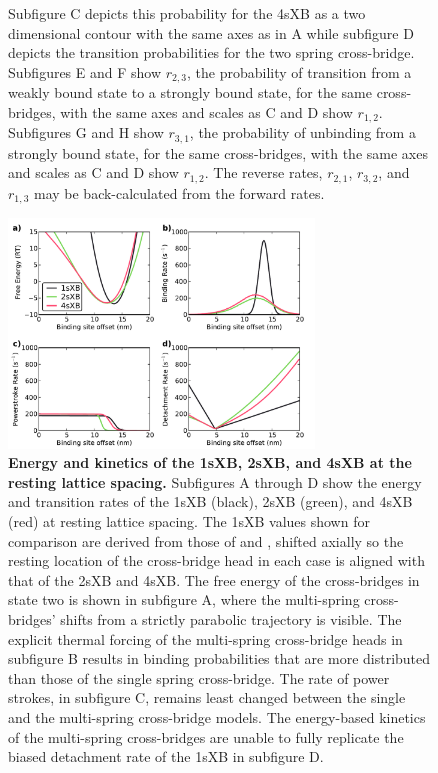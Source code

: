 \documentclass[]{article}
\begin{document}
\begin{figure}[ht]
\begin{center}
{        Subfigure C depicts this probability for the 4sXB as a two dimensional contour with the same axes as in A while subfigure D depicts the transition probabilities for the two spring cross-bridge.
        Subfigures E and F show $r_{2,3}$, the probability of transition from a weakly bound state to a strongly bound state, for the same cross-bridges, with the same axes and scales as C and D show $r_{1,2}$.
        Subfigures G and H show $r_{3,1}$, the probability of unbinding from a strongly bound state, for the same cross-bridges, with the same axes and scales as C and D show $r_{1,2}$.
        The reverse rates, $r_{2,1}$, $r_{3,2}$, and $r_{1,3}$ may be back-calculated from the forward rates.
    }
    \end{center}
\end{figure}

\begin{figure}[ht]
    \begin{center}
    \includegraphics[width=3.2in]{../imgs/Figure3.pdf}
    \caption{
        \label{fig_kinetics_cuts}
        \textbf{Energy and kinetics of the 1sXB, 2sXB, and 4sXB at the resting lattice spacing.}
        Subfigures A through D show the energy and transition rates of the 1sXB (black), 2sXB (green), and 4sXB (red) at resting lattice spacing.
        The 1sXB values shown for comparison are derived from those of \citet{Daniel1998} and \citet{Tanner2007}, shifted axially so the resting location of the cross-bridge head in each case is aligned with that of the 2sXB and 4sXB\@. 
        The free energy of the cross-bridges in state two is shown in subfigure A, where the multi-spring cross-bridges' shifts from a strictly parabolic trajectory is visible.
        The explicit thermal forcing of the multi-spring cross-bridge heads in subfigure B results in binding probabilities that are more distributed than those of the single spring cross-bridge.
        The rate of power strokes, in subfigure C, remains least changed between the single and the multi-spring cross-bridge models.
        The energy-based kinetics of the multi-spring cross-bridges are unable to fully replicate the biased detachment rate of the 1sXB in subfigure D. 
    }
    \end{center}
\end{figure}
\end{document}

